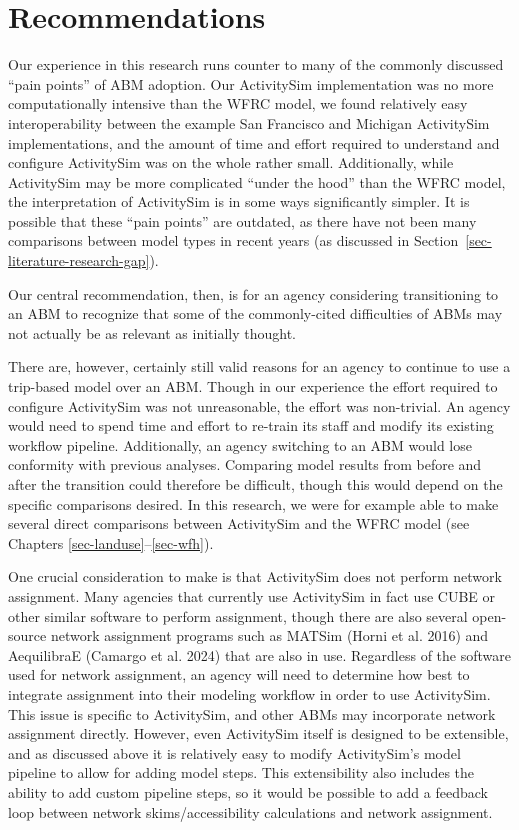 \documentclass[fancy, oneside, mastersfancy, ms]{byuthesis}
\begin{document}
\section{Recommendations}\label{recommendations}

Our experience in this research runs counter to many of the commonly
discussed ``pain points'' of ABM adoption. Our ActivitySim
implementation was no more computationally intensive than the WFRC
model, we found relatively easy interoperability between the example San
Francisco and Michigan ActivitySim implementations, and the amount of
time and effort required to understand and configure ActivitySim was on
the whole rather small. Additionally, while ActivitySim may be more
complicated ``under the hood'' than the WFRC model, the interpretation
of ActivitySim is in some ways significantly simpler. It is possible
that these ``pain points'' are outdated, as there have not been many
comparisons between model types in recent years (as discussed in
Section~\ref{sec-literature-research-gap}).

Our central recommendation, then, is for an agency considering
transitioning to an ABM to recognize that some of the commonly-cited
difficulties of ABMs may not actually be as relevant as initially
thought.

There are, however, certainly still valid reasons for an agency to
continue to use a trip-based model over an ABM. Though in our experience
the effort required to configure ActivitySim was not unreasonable, the
effort was non-trivial. An agency would need to spend time and effort to
re-train its staff and modify its existing workflow pipeline.
Additionally, an agency switching to an ABM would lose conformity with
previous analyses. Comparing model results from before and after the
transition could therefore be difficult, though this would depend on the
specific comparisons desired. In this research, we were for example able
to make several direct comparisons between ActivitySim and the WFRC
model (see Chapters \ref{sec-landuse}--\ref{sec-wfh}).

One crucial consideration to make is that ActivitySim does not perform
network assignment. Many agencies that currently use ActivitySim in fact
use CUBE or other similar software to perform assignment, though there
are also several open-source network assignment programs such as MATSim
(Horni et al. 2016) and AequilibraE (Camargo et al. 2024) that are also
in use. Regardless of the software used for network assignment, an
agency will need to determine how best to integrate assignment into
their modeling workflow in order to use ActivitySim. This issue is
specific to ActivitySim, and other ABMs may incorporate network
assignment directly. However, even ActivitySim itself is designed to be
extensible, and as discussed above it is relatively easy to modify
ActivitySim's model pipeline to allow for adding model steps. This
extensibility also includes the ability to add custom pipeline steps, so
it would be possible to add a feedback loop between network
skims/accessibility calculations and network assignment.
\end{document}
